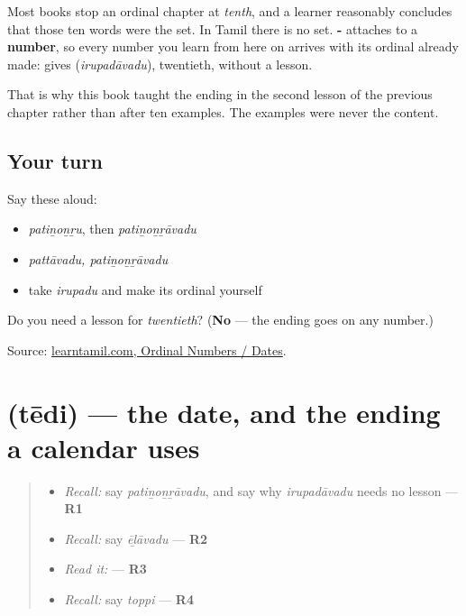 \begin{grammarlens}[title={Grammar Lens: the ending is a fact about numbers, not about ten}]
Most books stop an ordinal chapter at \emph{tenth}, and a learner reasonably concludes that those ten words were the set. In Tamil there is no set. \textbf{-} attaches to a \textbf{number}, so every number you learn from here on arrives with its ordinal already made: \textbf{} gives \textbf{} (\emph{irupadāvadu}), twentieth, without a lesson.

That is why this book taught the ending in the second lesson of the previous chapter rather than after ten examples. The examples were never the content.
\end{grammarlens}

\subsection*{Your turn}
Say these aloud:

\begin{itemize}
\raggedright
  \item \emph{patiṉoṉṟu}, then \emph{patiṉoṉṟāvadu}
  \item \emph{pattāvadu, patiṉoṉṟāvadu}
  \item take \emph{irupadu} and make its ordinal yourself
\end{itemize}

\begin{tcolorbox}[breakable,colback=teal!4,colframe=teal!35!black,title={Before you move on}]
Do you need a lesson for \emph{twentieth}? (\textbf{No} — the ending goes on any number.)

Source: \href{https://www.learntamil.com/part1/ch02/ordinal-numbers-dates/}{learntamil.com, Ordinal Numbers / Dates}.
\end{tcolorbox}
\section[\texorpdfstring{\ta{தேதி} (tēdi)}{தேதி (tēdi)}]{ (tēdi) — the date, and the ending a calendar uses}

\label{lesson:TA-C83-date}



\begin{quote}
\begin{itemize}
\raggedright
  \item \emph{Recall:} say \emph{patiṉoṉṟāvadu}, and say why \emph{irupadāvadu} needs no lesson — \textbf{R1}
  \item \emph{Recall:} say \emph{ēḻāvadu} — \textbf{R2}
  \item \emph{Read it:} \textbf{} — \textbf{R3}
  \item \emph{Recall:} say \emph{toppi} — \textbf{R4}
\end{itemize}
\end{quote}

